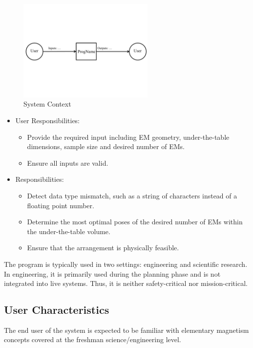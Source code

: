 \documentclass[12pt]{article}
\begin{document}
\begin{figure}[h!]
\begin{center}
 \includegraphics[width=0.6\textwidth]{SystemContextFigure}
\caption{System Context}
\label{Fig_SystemContext} 
\end{center}
\end{figure}
\begin{itemize}
\item User Responsibilities:
\begin{itemize}
\item Provide the required input including EM geometry, under-the-table dimensions, sample size and desired number of EMs. 
\item Ensure all inputs are valid.
\end{itemize}
\item \progname{} Responsibilities:
\begin{itemize}
\item Detect data type mismatch, such as a string of characters instead of a
  floating point number.
\item Determine the most optimal poses of the desired number of EMs within the under-the-table volume. 
\item Ensure that the arrangement is physically feasible. 
\end{itemize}
\end{itemize}

The program is typically used in two settings: engineering and scientific research. In engineering, it is primarily used during the planning phase and is not integrated into live systems. Thus, it is neither safety-critical nor mission-critical.

\subsection{User Characteristics} \label{SecUserCharacteristics}
The end user of the system is expected to be familiar with elementary magnetism concepts covered at the freshman science/engineering level. 
\end{document}
